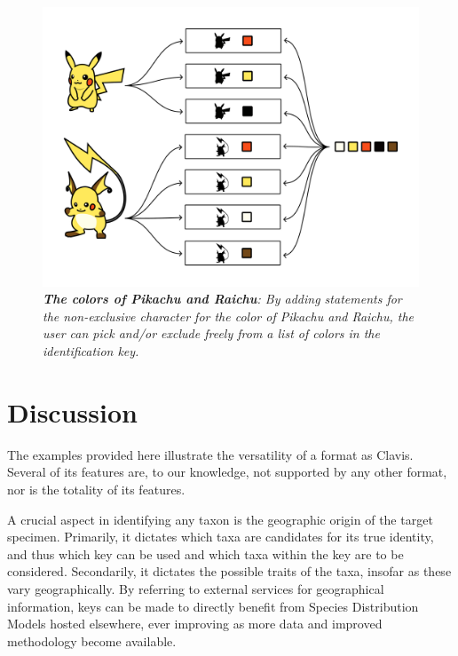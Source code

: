\documentclass[10pt,letterpaper]{article}
\begin{document}
\begin{figure}[!h]
  \includegraphics[width=\textwidth]{Images/Fig4}
  \caption{\textit{\textbf{The colors of Pikachu and Raichu}:
By adding statements for the non-exclusive character for the color of Pikachu and Raichu, the user can pick and/or exclude freely from a list of colors in the identification key.
}}
 \label{fig4}
\end{figure}

\section*{
Discussion
}
The examples provided here illustrate the versatility of a format as Clavis. Several of its features are, to our knowledge, not supported by any other format, nor is the totality of its features.

A crucial aspect in identifying any taxon is the geographic origin of the target specimen. Primarily, it dictates which taxa are candidates for its true identity, and thus which key can be used and which taxa within the key are to be considered. Secondarily, it dictates the possible traits of the taxa, insofar as these vary geographically. By referring to external services for geographical information, keys can be made to directly benefit from Species Distribution Models hosted elsewhere, ever improving as more data and improved methodology become available.
\end{document}

